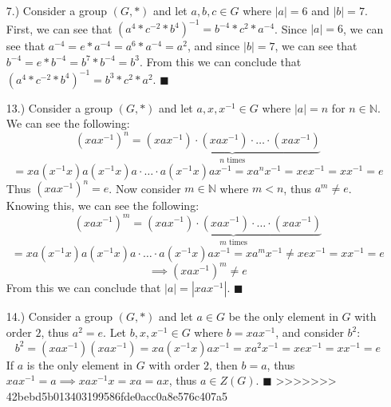 \documentclass[12pt]{article}
\newcommand{\vertb}[1]{\left\vert#1\right\vert}      %
\newcommand{\parens}[1]{\left(#1\right)}             %
\newcommand{\N}{\mathbb{N}}
\begin{document}
\begin{itemize}
    \item [7.)] Consider a group $(G,*)$ and let $a,b,c\in G$ where $\vertb{a}=6$ and $\vertb{b}=7$. First, we can see that $\parens{a^4*c^{-2}*b^4}^{-1}=b^{-4}*c^2*a^{-4}$. Since $\vertb{a}=6$, we can see that $a^{-4}=e*a^{-4}=a^6*a^{-4}=a^2$, and since $\vertb{b}=7$, we can see that $b^{-4}=e*b^{-4}=b^7*b^{-4}=b^3$. From this we can conclude that $\parens{a^4*c^{-2}*b^4}^{-1}=b^3*c^2*a^2$. $\blacksquare$

    \item [13.)] Consider a group $(G,*)$ and let $a,x,x^{-1}\in G$ where $\vertb{a}=n$ for $n\in\N$. We can see the following:
    \[\parens{xax^{-1}}^n=\underbrace{\parens{xax^{-1}}\cdot\parens{xax^{-1}}\cdot\ldots\cdot\parens{xax^{-1}}}_\text{$n$ times}\]
    \[=xa\parens{x^{-1}x}a\parens{x^{-1}x}a\cdot\ldots\cdot a\parens{x^{-1}x}ax^{-1}=xa^nx^{-1}=xex^{-1}=xx^{-1}=e\]
    Thus $\parens{xax^{-1}}^n=e$. Now consider $m\in\N$ where $m<n$, thus $a^m\ne e$. Knowing this, we can see the following:
    \[\parens{xax^{-1}}^m=\underbrace{\parens{xax^{-1}}\cdot\parens{xax^{-1}}\cdot\ldots\cdot\parens{xax^{-1}}}_\text{$m$ times}\]
    \[=xa\parens{x^{-1}x}a\parens{x^{-1}x}a\cdot\ldots\cdot a\parens{x^{-1}x}ax^{-1}=xa^mx^{-1}\ne xex^{-1}=xx^{-1}=e\]
    \[\implies\parens{xax^{-1}}^m\ne e\]
    From this we can conclude that $\vertb{a}=\vertb{xax^{-1}}$. $\blacksquare$

    \item [14.)] Consider a group $(G,*)$ and let $a\in G$ be the only element in $G$ with order $2$, thus $a^2=e$. Let $b,x,x^{-1}\in G$ where $b=xax^{-1}$, and consider $b^2$:
    \[b^2=\parens{xax^{-1}}\parens{xax^{-1}}=xa\parens{x^{-1}x}ax^{-1}=xa^2x^{-1}=xex^{-1}=xx^{-1}=e\]
    If $a$ is the only element in $G$ with order $2$, then $b=a$, thus $xax^{-1}=a\implies xax^{-1}x=xa=ax$, thus $a\in Z(G)$. $\blacksquare$
>>>>>>> 42bebd5b013403199586fde0acc0a8e576c407a5
\end{itemize}
\end{document}
